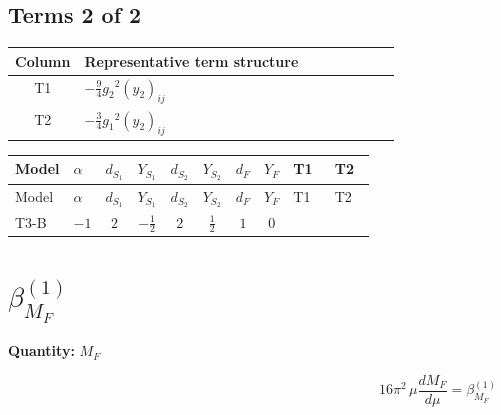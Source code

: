 \documentclass[8pt]{article}
\begin{document}
\begin{landscape}
\subsection*{Terms 2 of 2}
\begin{center}
\begin{tabular}{@{}c >{\raggedright\arraybackslash}p{0.82\linewidth}@{}}
\toprule
Column & Representative term structure \\
\midrule
T1 & \(\displaystyle -\frac{9}{4} {g_2}^2 \left({y_2}\right)_{ij}\) \\
\midrule
T2 & \(\displaystyle -\frac{3}{4} {g_1}^2 \left({y_2}\right)_{ij}\) \\
\midrule
\bottomrule
\end{tabular}
\end{center}
\smallskip
\tiny
\begin{longtable}{@{}llcccccc >{\raggedright\arraybackslash}p{0.21\linewidth} >{\raggedright\arraybackslash}p{0.21\linewidth}@{}}
\toprule
Model & $\alpha$ & $d_{S_1}$ & $Y_{S_1}$ & $d_{S_2}$ & $Y_{S_2}$ & $d_F$ & $Y_F$ & T1 & T2 \\
\midrule
\endfirsthead
\toprule
Model & $\alpha$ & $d_{S_1}$ & $Y_{S_1}$ & $d_{S_2}$ & $Y_{S_2}$ & $d_F$ & $Y_F$ & T1 & T2 \\
\midrule
\endhead
T3-B & $-1$ & $2$ & $-\frac{1}{2}$ & $2$ & $\frac{1}{2}$ & $1$ & $0$ & \scriptsize\adjustbox{max width=\linewidth}{$\begin{gathered} -\frac{9}{4} {g_2}^2 \left({y_2}\right)_{ij}\end{gathered}$} & \scriptsize\adjustbox{max width=\linewidth}{$\begin{gathered} -\frac{3}{4} {g_1}^2 \left({y_2}\right)_{ij}\end{gathered}$} \\
\midrule
\bottomrule
\end{longtable}
\clearpage
\section*{$\beta_{M_F}^{(1)}$}
\noindent\textbf{Quantity: }$M_F$\par\smallskip
\[16\pi^2\,\mu\frac{d M_F}{d\mu}=\beta_{M_F}^{(1)}\]

\end{landscape}
\end{document}
